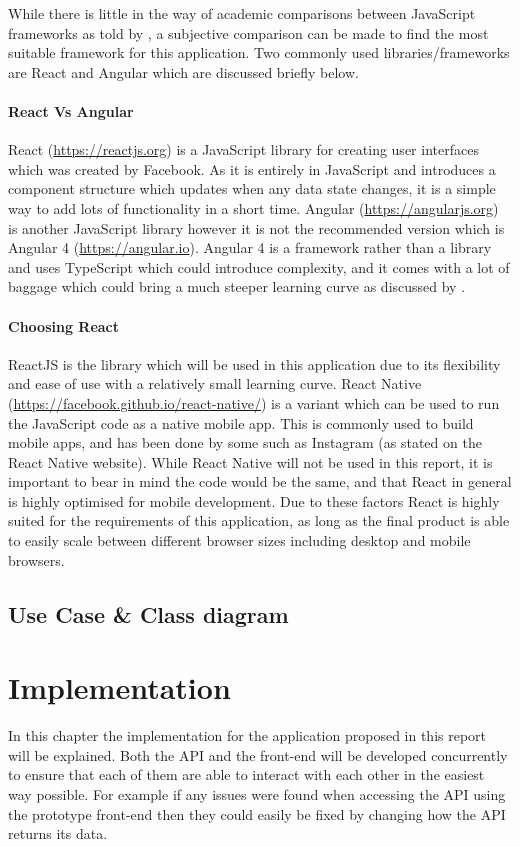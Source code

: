 \documentclass[a4paper,12pt]{report}
\begin{document}
      While there is little in the way of academic comparisons between JavaScript frameworks as told by \cite{graziotin2013making}, a subjective comparison can be made to find the most suitable framework for this application. Two commonly used libraries/frameworks are React and Angular which are discussed briefly below.

      \subsubsection{React Vs Angular}
        React (\url{https://reactjs.org}) is a JavaScript library for creating user interfaces which was created by Facebook. As it is entirely in JavaScript and introduces a component structure which updates when any data state changes, it is a simple way to add lots of functionality in a short time. Angular (\url{https://angularjs.org}) is another JavaScript library however it is not the recommended version which is Angular 4 (\url{https://angular.io}). Angular 4 is a framework rather than a library and uses TypeScript which could introduce complexity, and it comes with a lot of baggage which could bring a much steeper learning curve as discussed by \cite{neuhaus_2017}.

      \subsubsection{Choosing React}
        ReactJS is the library which will be used in this application due to its flexibility and ease of use with a relatively small learning curve. React Native (\url{https://facebook.github.io/react-native/}) is a variant which can be used to run the JavaScript code as a native mobile app. This is commonly used to build mobile apps, and has been done by some such as Instagram (as stated on the React Native website). While React Native will not be used in this report, it is important to bear in mind the code would be the same, and that React in general is highly optimised for mobile development. Due to these factors React is highly suited for the requirements of this application, as long as the final product is able to easily scale between different browser sizes including desktop and mobile browsers.

  \section{Use Case \& Class diagram}

\chapter{Implementation} \label{cha:implement}
  In this chapter the implementation for the application proposed in this report will be explained. Both the API and the front-end will be developed concurrently to ensure that each of them are able to interact with each other in the easiest way possible. For example if any issues were found when accessing the API using the prototype front-end then they could easily be fixed by changing how the API returns its data.
\end{document}
